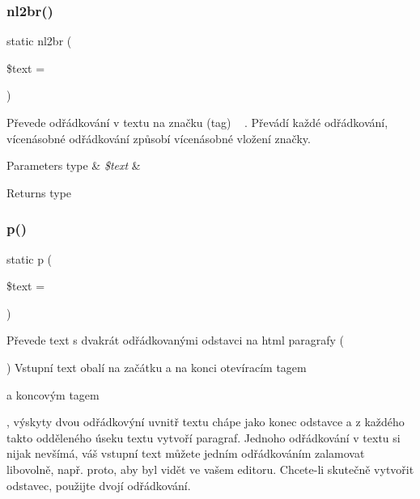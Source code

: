 \subsubsection{\texorpdfstring{nl2br()}{nl2br()}}
{\footnotesize\ttfamily static nl2br (\begin{DoxyParamCaption}\item[{}]{\$text = {\ttfamily \textquotesingle{}\textquotesingle{}} }\end{DoxyParamCaption})\hspace{0.3cm}{\ttfamily [static]}}

Převede odřádkování v textu na značku (tag) ~\newline
. Převádí každé odřádkování, vícenásobné odřádkování způsobí vícenásobné vložení značky.


\begin{DoxyParams}[1]{Parameters}
type & {\em \$text} & \\
\hline
\end{DoxyParams}
\begin{DoxyReturn}{Returns}
type 
\end{DoxyReturn}
\mbox{\label{class_pes_1_1_text_1_1_html_a78c9ebed5fc953d2eeb3801738777d54}} 
\subsubsection{\texorpdfstring{p()}{p()}}
{\footnotesize\ttfamily static p (\begin{DoxyParamCaption}\item[{}]{\$text = {\ttfamily \textquotesingle{}\textquotesingle{}} }\end{DoxyParamCaption})\hspace{0.3cm}{\ttfamily [static]}}

Převede text s dvakrát odřádkovanými odstavci na html paragrafy (

) Vstupní text obalí na začátku a na konci otevíracím tagem 

a koncovým tagem 

, výskyty dvou odřádkovýní uvnitř textu chápe jako konec odstavce a z každého takto odděleného úseku textu vytvoří paragraf. Jednoho odřádkování v textu si nijak nevšímá, váš vstupní text můžete jedním odřádkováním zalamovat libovolně, např. proto, aby byl vidět ve vašem editoru. Chcete-\/li skutečně vytvořit odstavec, použijte dvojí odřádkování.

